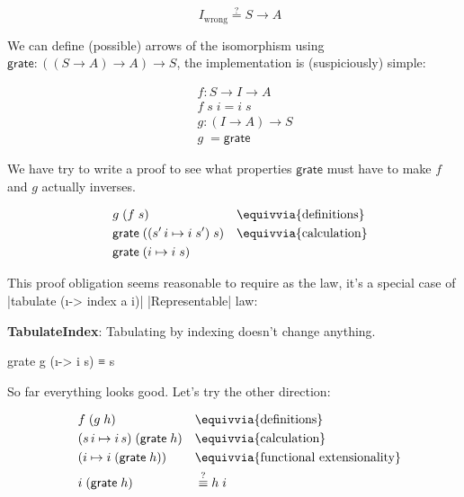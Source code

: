 \documentclass{article}
\begin{document}
\begin{equation}
\quad I_{\mathrm{wrong}} \stackrel{?}{=} S \to A
\end{equation}

We can define (possible) arrows of the isomorphism using $\mathsf{grate} : ((S \to A) \to A) \to S$,
the implementation is (suspiciously) simple:

\begin{equation}
\begin{aligned}
\quad &f : S \to I \to A \\
      &f\; s\; i= i\; s \\
      &g : (I \to A) \to S \\
      &g\; = \mathsf{grate}
\end{aligned}
\end{equation}

We have try to write a proof to see what properties $\mathsf{grate}$ must have
to make $f$ and $g$ actually inverses.

\begin{equation}
\begin{aligned}
\quad & g\; (f\; s) &&\equivvia{\text{definitions}} \\
  & \mathsf{grate}\;((s'\,i \mapsto i\; s')\;s)  &&\equivvia{\text{calculation}} \\
  & \mathsf{grate}\;(i \mapsto i\; s)
\end{aligned}
\end{equation}

This proof obligation seems reasonable to require as the law,
it's a special case of |tabulate (\i -> index a i)| |Representable| law:

\textbf{TabulateIndex}: Tabulating by indexing doesn't change anything.

\begin{code}
grate g (\i -> i s) ≡ s
\end{code}

So far everything looks good. Let's try the other direction:

\begin{equation}
\begin{aligned}
\quad & f\; (g\; h) &&\equivvia{\text{definitions}} \\
  & (s\,i \mapsto i \,s)\;(\mathsf{grate}\;h) &&\equivvia{\text{calculation}} \\
  & (i \mapsto i\; (\mathsf{grate}\;h)) &&\equivvia{\text{functional extensionality}} \\
  & i\;(\mathsf{grate}\;h) &&\stackrel{?}{\equiv} h\; i
\end{aligned}
\end{equation}
\end{document}
